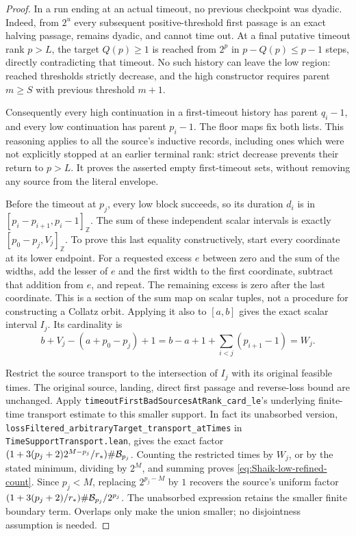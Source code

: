 \begin{proof}
In a run ending at an actual timeout, no previous checkpoint was
dyadic. Indeed, from \(2^u\) every subsequent positive-threshold
first passage is an exact halving passage, remains dyadic, and
cannot time out. At a final putative timeout rank \(p>L\), the
target \(Q(p)\ge1\) is reached from \(2^p\) in
\(p-Q(p)\le p-1\) steps, directly contradicting that timeout.
No such history can leave the low region: reached thresholds
strictly decrease, and the high constructor requires parent
\(m\ge S\) with previous threshold \(m+1\).

Consequently every high continuation in a first-timeout history has
parent \(q_i-1\), and every low continuation has parent \(p_i-1\).
The floor maps fix both lists. This reasoning applies to all the
source's inductive records, including ones which were not explicitly
stopped at an earlier terminal rank: strict decrease prevents their
return to \(p>L\). It proves the asserted empty first-timeout sets,
without removing any source from the literal envelope.

Before the timeout at \(p_j\), every low block succeeds, so its
duration \(d_i\) is in \([p_i-p_{i+1},p_i-1]_{\mathbb Z}\).
The sum of these independent scalar intervals is exactly
\([p_0-p_j,V_j]_{\mathbb Z}\). To prove this last equality
constructively, start every coordinate at its lower endpoint.
For a requested excess \(e\) between zero and the sum of the
widths, add the lesser of \(e\) and the first width to the first
coordinate, subtract that addition from \(e\), and repeat.
The remaining excess is zero after the last coordinate.
This is a section of the sum map on scalar tuples, not a procedure
for constructing a Collatz orbit. Applying it also to \([a,b]\)
gives the exact scalar interval \(I_j\). Its cardinality is
\[
 b+V_j-(a+p_0-p_j)+1
 =b-a+1+\sum_{i<j}(p_{i+1}-1)=W_j.
\]

Restrict the source transport to the intersection of \(I_j\) with
its original feasible times. The original source, landing, direct
first passage and reverse-loss bound are unchanged. Apply
\texttt{timeoutFirstBadSourcesAtRank\_card\_le}'s underlying
finite-time transport estimate to this smaller support. In fact its
unabsorbed version,
\texttt{lossFiltered\_arbitraryTarget\_transport\_atTimes}
in \texttt{TimeSupportTransport.lean}, gives the exact factor
\((1+3(p_j+2)2^{M-p_j}/r_*)\#{\cal B}_{p_j}\).
Counting the restricted times by \(W_j\), or by the stated minimum,
dividing by \(2^M\), and summing proves
\eqref{eq:Shaik-low-refined-count}. Since \(p_j<M\), replacing
\(2^{p_j-M}\) by \(1\) recovers the source's uniform factor
\((1+3(p_j+2)/r_*)\#{\cal B}_{p_j}/2^{p_j}\).
The unabsorbed expression retains the smaller finite boundary term.
Overlaps only make the union smaller; no disjointness assumption is needed.
\end{proof}

